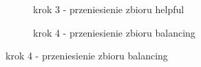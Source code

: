 \begin{figure}[h]
\begin{subfigure}{.5\textwidth}
    \centering
    \caption[short]{krok 3 - przeniesienie zbioru helpful}
\end{subfigure}
\begin{subfigure}{.5\textwidth}
    \centering
    \caption[short]{krok 4 - przeniesienie zbioru balancing}
\end{subfigure}%


\end{figure}
